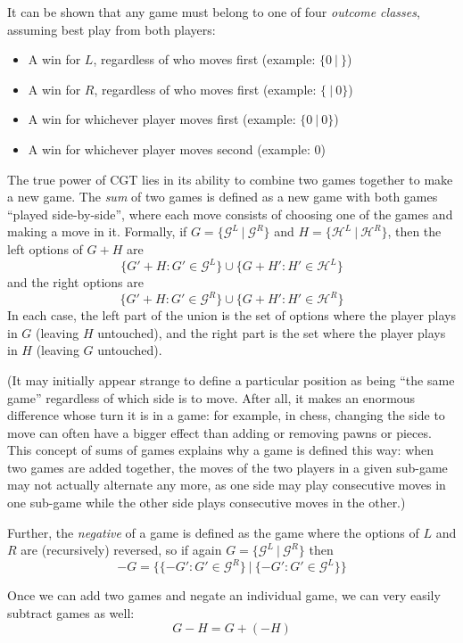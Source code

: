 \documentclass[a4paper,twocolumn]{article}
\newcommand{\cgtgame}[2]{\{#1 \:|\: #2\}}
\begin{document}
It can be shown that any game must belong to one of four \emph{outcome
  classes}, assuming best play from both players:

\begin{itemize}
  \item A win for $L$, regardless of who moves first (example:
    $\cgtgame{0}{}$)
  \item A win for $R$, regardless of who moves first (example:
    $\cgtgame{}{0}$)
  \item A win for whichever player moves first (example:
    $\cgtgame{0}{0}$)
  \item A win for whichever player moves second (example: $0$)
\end{itemize}

The true power of CGT lies in its ability to combine two games
together to make a new game. The \emph{sum} of two games is defined as
a new game with both games ``played side-by-side'', where each move
consists of choosing one of the games and making a move in
it. Formally, if $G = \cgtgame{\mathcal{G}^L}{\mathcal{G}^R}$ and $H =
\cgtgame{\mathcal{H}^L}{\mathcal{H}^R}$, then the left options of
$G+H$ are $$\{G'+H : G' \in \mathcal{G}^L\} \cup \{G+H' : H' \in
\mathcal{H}^L\}$$ and the right options are $$\{G'+H : G' \in
\mathcal{G}^R\} \cup \{G+H' : H' \in \mathcal{H}^R\}$$ In each case,
the left part of the union is the set of options where the player
plays in $G$ (leaving $H$ untouched), and the right part is the set
where the player plays in $H$ (leaving $G$ untouched).

(It may initially appear strange to define a particular position as
being ``the same game'' regardless of which side is to move. After
all, it makes an enormous difference whose turn it is in a game: for
example, in chess, changing the side to move can often have a bigger
effect than adding or removing pawns or pieces. This concept of sums
of games explains why a game is defined this way: when two games are
added together, the moves of the two players in a given sub-game may
not actually alternate any more, as one side may play consecutive
moves in one sub-game while the other side plays consecutive moves in
the other.)

Further, the \emph{negative} of a game is defined as the game where
the options of $L$ and $R$ are (recursively) reversed, so if again $G
= \cgtgame{\mathcal{G}^L}{\mathcal{G}^R}$ then $$-G = \cgtgame{\{-G' :
  G' \in \mathcal{G}^R\}}{\{-G' : G' \in \mathcal{G}^L\}}$$

Once we can add two games and negate an individual game, we can very
easily subtract games as well: $$G - H = G + (-H)$$
\end{document}
